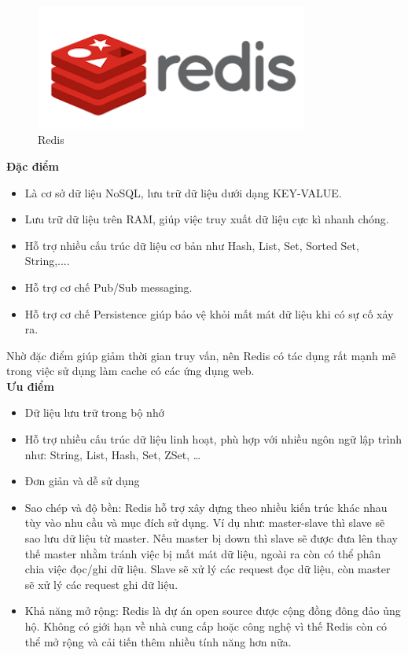             \begin{figure}[H]   			
            	\includegraphics[width=0.8\textwidth]{Images/redis.png}
            	\centering
            	\linebreak
            	\caption{Redis}
            \end{figure}
            
            
            \textbf{Đặc điểm}
            
            \begin{itemize}
                \item Là cơ sở dữ liệu NoSQL, lưu trữ dữ liệu dưới dạng KEY-VALUE.
                \item Lưu trữ dữ liệu trên RAM, giúp việc truy xuất dữ liệu cực kì nhanh chóng.
                \item Hỗ trợ nhiều cấu trúc dữ liệu cơ bản như Hash, List, Set, Sorted Set, String,....
                \item Hỗ trợ cơ chế Pub/Sub messaging.
                \item Hỗ trợ cơ chế Persistence giúp bảo vệ khỏi mất mát dữ liệu khi có sự cố xảy ra.
            \end{itemize}
            
            Nhờ đặc điểm giúp giảm thời gian truy vấn, nên Redis có tác dụng rất mạnh mẽ trong việc sử dụng làm cache có các ứng dụng web.\\ 
            
            \textbf{Ưu điểm}
            
            \begin{itemize}
                \item Dữ liệu lưu trữ trong bộ nhớ
                \item Hỗ trợ nhiều cấu trúc dữ liệu linh hoạt, phù hợp với nhiều ngôn ngữ lập trình như: String, List, Hash, Set, ZSet, …
                \item Đơn giản và dễ sử dụng
                \item Sao chép và độ bền: Redis hỗ trợ xây dựng theo nhiều kiến trúc khác nhau tùy vào nhu cầu và mục đích sử dụng. Ví dụ như: master-slave thì slave sẽ sao lưu dữ liệu từ master. Nếu master bị down thì slave sẽ được đưa lên thay thế master nhằm tránh việc bị mất mát dữ liệu, ngoài ra còn có thể phân chia việc đọc/ghi dữ liệu. Slave sẽ xử lý các request đọc dữ liệu, còn master sẽ xử lý các request ghi dữ liệu.
                \item Khả năng mở rộng: Redis là dự án open source được cộng đồng đông đảo ủng hộ. Không có giới hạn về nhà cung cấp hoặc công nghệ vì thế Redis còn có thể mở rộng và cải tiến thêm nhiều tính năng hơn nữa.
            \end{itemize}
            
